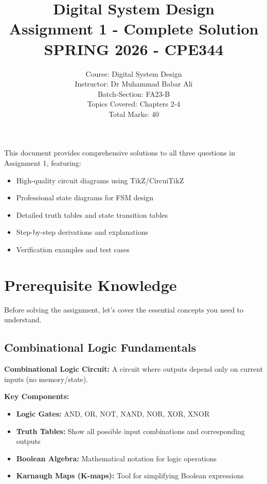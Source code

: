 \documentclass[12pt,a4paper]{article}
\title{
  \vspace{-2cm}
  \textbf{\LARGE Digital System Design}\\
  \vspace{0.5cm}
  \textbf{\Large Assignment 1 - Complete Solution}\\
  \vspace{0.3cm}
  \large SPRING 2026 - CPE344
}
\author{
  Course: Digital System Design\\
  Instructor: Dr Muhammad Babar Ali\\
  Batch-Section: FA23-B\\
  Topics Covered: Chapters 2-4\\
  Total Marks: 40
}
\date{}
\begin{document}
\maketitle
\thispagestyle{fancy}

\begin{tcolorbox}[colback=blue!5!white,colframe=blue!75!black,title=Document Overview]
This document provides comprehensive solutions to all three questions in Assignment 1, featuring:
\begin{itemize}[leftmargin=*]
  \item High-quality circuit diagrams using TikZ/CircuiTikZ
  \item Professional state diagrams for FSM design
  \item Detailed truth tables and state transition tables
  \item Step-by-step derivations and explanations
  \item Verification examples and test cases
\end{itemize}
\end{tcolorbox}

\tableofcontents
\newpage

\section{Prerequisite Knowledge}

Before solving the assignment, let's cover the essential concepts you need to understand.

\subsection{Combinational Logic Fundamentals}

\textbf{Combinational Logic Circuit:} A circuit where outputs depend only on current inputs (no memory/state).

\textbf{Key Components:}
\begin{itemize}
  \item \textbf{Logic Gates:} AND, OR, NOT, NAND, NOR, XOR, XNOR
  \item \textbf{Truth Tables:} Show all possible input combinations and corresponding outputs
  \item \textbf{Boolean Algebra:} Mathematical notation for logic operations
  \item \textbf{Karnaugh Maps (K-maps):} Tool for simplifying Boolean expressions
\end{itemize}
\end{document}
